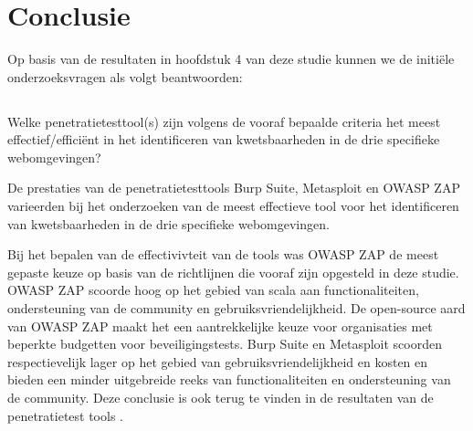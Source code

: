 
\chapter{Conclusie}%
\label{ch:conclusie}


Op basis van de resultaten in hoofdstuk 4 van deze studie kunnen we de initiële onderzoeksvragen als volgt beantwoorden:

\section{}
  Welke penetratietesttool(s) zijn volgens de vooraf bepaalde criteria het meest effectief/efficiënt in het 
  identificeren van kwetsbaarheden in de drie specifieke webomgevingen?
  
  De prestaties van de penetratietesttools Burp Suite, Metasploit en OWASP ZAP varieerden bij het onderzoeken van de 
  meest effectieve tool voor het identificeren van kwetsbaarheden in de drie specifieke webomgevingen.

  Bij het bepalen van de effectivivteit van de tools was OWASP ZAP de meest gepaste keuze op basis van de richtlijnen 
  die vooraf zijn opgesteld in deze studie. OWASP ZAP scoorde hoog op het gebied van scala aan functionaliteiten, 
  ondersteuning van de community en gebruiksvriendelijkheid. De open-source aard van OWASP ZAP maakt het een aantrekkelijke 
  keuze voor organisaties met beperkte budgetten voor beveiligingstests. Burp Suite en Metasploit scoorden respectievelijk 
  lager op het gebied van gebruiksvriendelijkheid en kosten en bieden een minder uitgebreide reeks van functionaliteiten en 
  ondersteuning van de community. Deze conclusie is ook terug te vinden in de resultaten van de penetratietest tools 
  .

